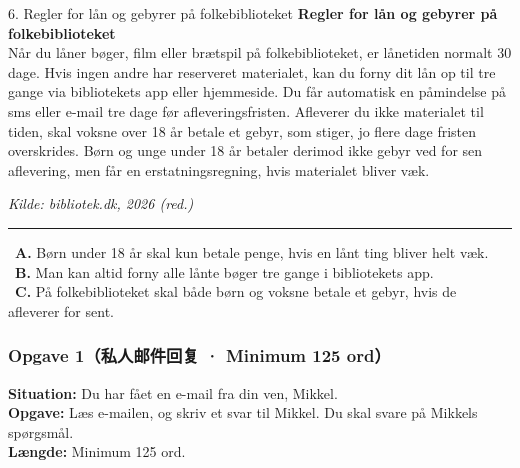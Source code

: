 \begin{emailbox}{6. Regler for lån og gebyrer på folkebiblioteket}
\textbf{Regler for lån og gebyrer på folkebiblioteket}\\
Når du låner bøger, film eller brætspil på folkebiblioteket, er lånetiden normalt 30 dage. Hvis ingen andre har reserveret materialet, kan du forny dit lån op til tre gange via bibliotekets app eller hjemmeside. Du får automatisk en påmindelse på sms eller e-mail tre dage før afleveringsfristen. Afleverer du ikke materialet til tiden, skal voksne over 18 år betale et gebyr, som stiger, jo flere dage fristen overskrides. Børn og unge under 18 år betaler derimod ikke gebyr ved for sen aflevering, men får en erstatningsregning, hvis materialet bliver væk.
\par\noindent\hfill {\small\textit{Kilde: bibliotek.dk, 2026 (red.)}}

\vspace{0.3em}
\hrule
\vspace{0.3em}
\small
\fbox{\phantom{X}}\ \textbf{A.} Børn under 18 år skal kun betale penge, hvis en lånt ting bliver helt væk.\\[0.25em]
\fbox{\phantom{X}}\ \textbf{B.} Man kan altid forny alle lånte bøger tre gange i bibliotekets app.\\[0.25em]
\fbox{\phantom{X}}\ \textbf{C.} På folkebiblioteket skal både børn og voksne betale et gebyr, hvis de afleverer for sent.
\end{emailbox}


\subsubsection*{Opgave 1（私人邮件回复 · Minimum 125 ord）}

\textbf{Situation:} Du har fået en e-mail fra din ven, Mikkel.\\
\textbf{Opgave:} Læs e-mailen, og skriv et svar til Mikkel. Du skal svare på Mikkels spørgsmål.\\
\textbf{Længde:} Minimum 125 ord.

